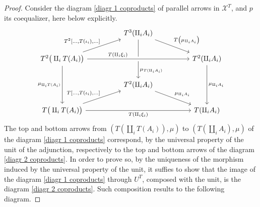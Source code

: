 \begin{subbox}{}
    \begin{proof}
        Consider the diagram \eqref{diagr 1 coproducts} of parallel arrows in $\mathcal{X}^T$, and $p$ its coequalizer, here below explicitly.
        \[
\begin{tikzcd}
                                                                                                                                          &  & T^3(\amalg_iA_i) \arrow[dd, "\mu_{T(\amalg_iA_i)}", pos=0.8] \arrow[rrd, "T\big(\mu_{\amalg_iA_i}\big)"] &  &                                              \\
T^2\big(\amalg_iT(A_i)\big) \arrow[dd, "\mu_{\amalg_iT(A_i)}"'] \arrow[rru, "{T^2[\ldots,T(\iota_i),\ldots]}"] \arrow[rrrr, "T(\amalg_i\xi_i)", pos=0.3, crossing over] &  &                                                                                   &  & T^2(\amalg_iA_i) \arrow[dd, "\mu_{\amalg_iA_i}"] \\
                                                                                                                                          &  & T^2(\amalg_iA_i) \arrow[rrd, "\mu_{\amalg_iA_i}"]                                     &  &                                              \\
T\big(\amalg_iT(A_i)\big) \arrow[rrrr, "T(\amalg_i\xi_i)"'] \arrow[rru, "{T[\ldots,T(\iota_i),\ldots]}"]                                      &  &                                                                                   &  & T(\amalg_iA_i)                                
\end{tikzcd}
\]
The top and bottom arrows from $(T(\amalg_iT(A_i)),\mu)$ to $(T(\amalg_iA_i),\mu)$ of the diagram \eqref{diagr 1 coproducts} correspond, by the universal property of the unit of the adjunction, respectively to the top and bottom arrows of the diagram \eqref{diagr 2 coproducts}. In order to prove so, by the uniqueness of the morphism induced by the universal property of the unit, it suffies to show that the image of the diagram \eqref{diagr 1 coproducts} through $U^T$, composed with the unit, is the diagram \eqref{diagr 2 coproducts}. Such composition results to the following diagram.

\end{proof}
\end{subbox}
